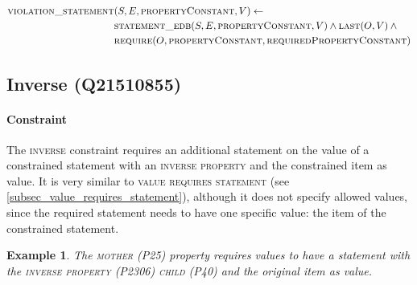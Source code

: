 \documentclass[hyperref,bachelorofscience,fleqn]{cgvpub}
\newtheorem{example}{Example}
\begin{document}
\begin{align}
\begin{split}
\textsc{violation\_statement}&(S, E, \textsc{propertyConstant}, V) \leftarrow \\
&\textsc{statement\_edb}(S, E, \textsc{propertyConstant}, V) \wedge{} \textsc{last}(O, V) \wedge{} \\
&\textsc{require}(O, \textsc{propertyConstant}, \textsc{requiredPropertyConstant})
\end{split}
\end{align}

\subsection{Inverse (Q21510855)}\label{subsec_2_inverse}
\paragraph{Constraint}
The \textsc{inverse} constraint requires an additional statement on the value of a constrained statement with an \textsc{inverse property} and the constrained item as value. It is very similar to \textsc{value requires statement} (see \ref{subsec_value_requires_statement}), although it does not specify allowed values, since the required statement needs to have one specific value: the item of the constrained statement.

\begin{example}
The \textsc{mother} (P25) property requires values to have a statement with the \textsc{inverse property} (P2306) \textsc{child} (P40) and the original item as value.
\end{example}
\end{document}
